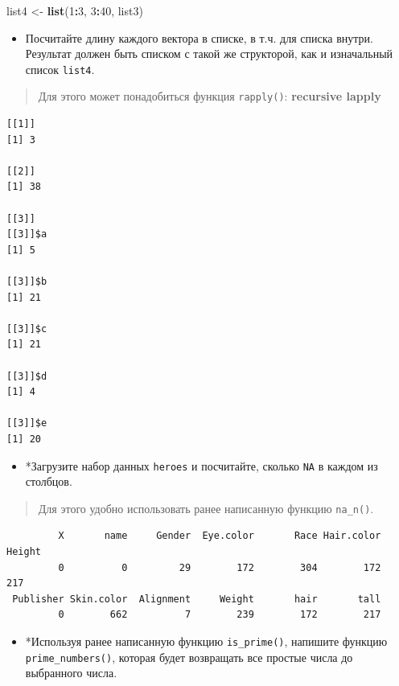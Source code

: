 \documentclass[
]{book}
\newenvironment{Shaded}{\begin{snugshade}}{\end{snugshade}}
\newcommand{\DecValTok}[1]{\textcolor[rgb]{0.00,0.00,0.81}{#1}}
\newcommand{\KeywordTok}[1]{\textcolor[rgb]{0.13,0.29,0.53}{\textbf{#1}}}
\newcommand{\NormalTok}[1]{#1}
\newcommand{\OperatorTok}[1]{\textcolor[rgb]{0.81,0.36,0.00}{\textbf{#1}}}
\newcommand{\StringTok}[1]{\textcolor[rgb]{0.31,0.60,0.02}{#1}}
\providecommand{\tightlist}{%
  \setlength{\itemsep}{0pt}\setlength{\parskip}{0pt}}
\begin{document}
\begin{Shaded}
\begin{Highlighting}[]
\NormalTok{list4 <-}\StringTok{ }\KeywordTok{list}\NormalTok{(}\DecValTok{1}\OperatorTok{:}\DecValTok{3}\NormalTok{, }\DecValTok{3}\OperatorTok{:}\DecValTok{40}\NormalTok{, list3)}
\end{Highlighting}
\end{Shaded}

\begin{itemize}
\tightlist
\item
  Посчитайте длину каждого вектора в списке, в т.ч. для списка внутри. Результат должен быть списком с такой же структорой, как и изначальный список \texttt{list4}.
\end{itemize}

\begin{quote}
Для этого может понадобиться функция \texttt{rapply()}: \textbf{recursive lapply}
\end{quote}

\begin{verbatim}
[[1]]
[1] 3

[[2]]
[1] 38

[[3]]
[[3]]$a
[1] 5

[[3]]$b
[1] 21

[[3]]$c
[1] 21

[[3]]$d
[1] 4

[[3]]$e
[1] 20
\end{verbatim}

\begin{itemize}
\tightlist
\item
  *Загрузите набор данных \texttt{heroes} и посчитайте, сколько \texttt{NA} в каждом из столбцов.
\end{itemize}

\begin{quote}
Для этого удобно использовать ранее написанную функцию \texttt{na\_n()}.
\end{quote}

\begin{verbatim}
         X       name     Gender  Eye.color       Race Hair.color     Height 
         0          0         29        172        304        172        217 
 Publisher Skin.color  Alignment     Weight       hair       tall 
         0        662          7        239        172        217 
\end{verbatim}

\begin{itemize}
\tightlist
\item
  *Используя ранее написанную функцию \texttt{is\_prime()}, напишите функцию \texttt{prime\_numbers()}, которая будет возвращать все простые числа до выбранного числа.
\end{itemize}
\end{document}
